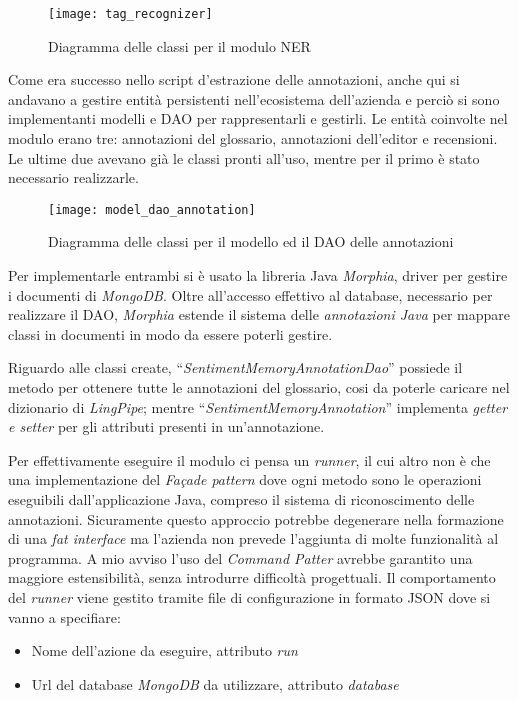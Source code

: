 \begin{figure}[H]
\begin{center}
\texttt{[image: tag\_recognizer]}
\caption{
Diagramma delle classi per il modulo NER
}
\label{fig:tag_recognizer}
\end{center}
\end{figure}

Come era successo nello \gls{script} d'estrazione delle annotazioni, anche qui
si andavano a gestire entità persistenti nell'ecosistema dell'azienda e perciò
si sono implementanti modelli e \gls{DAO} per rappresentarli e gestirli. Le
entità coinvolte nel modulo erano tre: annotazioni del glossario, annotazioni
dell'editor e recensioni. Le ultime due avevano già le classi pronti all'uso,
mentre per il primo è stato necessario realizzarle.

\begin{figure}[H]
\begin{center}
\texttt{[image: model\_dao\_annotation]}
\caption{
Diagramma delle classi per il modello ed il DAO delle annotazioni
}
\label{fig:model_dao_annotation}
\end{center}
\end{figure}

Per implementarle entrambi si è usato la libreria Java \textit{Morphia}, driver
per gestire i documenti di \textit{MongoDB}. Oltre all'accesso effettivo al
database, necessario per realizzare il \gls{DAO}, \textit{Morphia} estende il
sistema delle \textit{annotazioni Java} per mappare classi in documenti in modo
da essere poterli gestire.

Riguardo alle classi create, ``\textit{SentimentMemoryAnnotationDao}'' possiede
il metodo per ottenere tutte le annotazioni del glossario, cosi da poterle
caricare nel dizionario di \textit{LingPipe}; mentre
``\textit{SentimentMemoryAnnotation}'' implementa \textit{getter e setter} per
gli attributi presenti in un'annotazione.

Per effettivamente eseguire il modulo ci pensa un \textit{runner}, il cui altro
non è che una implementazione del \textit{Façade pattern} dove ogni metodo sono
le operazioni eseguibili dall'applicazione Java, compreso il sistema di
riconoscimento delle annotazioni. Sicuramente questo approccio potrebbe
degenerare nella formazione di una \textit{fat interface} ma l'azienda non
prevede l'aggiunta di molte funzionalità al programma. A mio avviso l'uso del
\textit{Command Patter} avrebbe garantito una maggiore estensibilità, senza
introdurre difficoltà progettuali. Il comportamento del \textit{runner} viene
gestito tramite file di configurazione in formato \gls{JSON} dove si vanno a
specifiare:
\begin{itemize}
\item Nome dell'azione da eseguire, attributo \textit{run}
\item Url del database \textit{MongoDB} da utilizzare, attributo
\textit{database}
\end{itemize}

